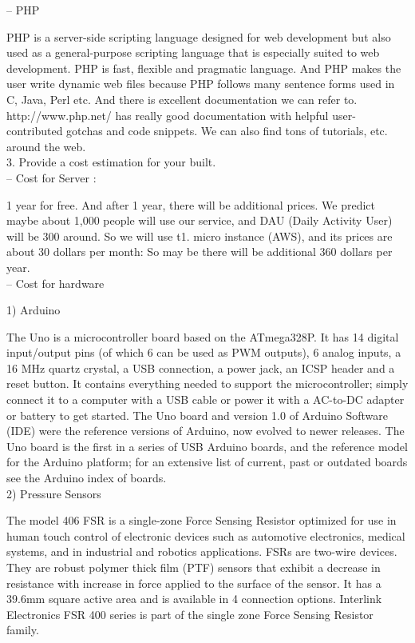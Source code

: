 \documentclass[conference]{IEEEtran}
\begin{document}
-- PHP

PHP is a server-side scripting language designed for web development but also used as a general-purpose scripting language that is especially suited to web development. PHP is fast, flexible and pragmatic language. And PHP makes the user write dynamic web files because PHP follows many sentence forms used in C, Java, Perl etc. And there is excellent documentation we can refer to. http://www.php.net/ has really good documentation with helpful user-contributed gotchas and code snippets. We can also find tons of tutorials, etc. around the web.\\

3.	Provide a cost estimation for your built.\\

-- Cost for Server :

1 year for free. And after 1 year, there will be additional prices. We predict maybe about 1,000 people will use our service, and DAU (Daily Activity User) will be 300 around. So we will use t1. micro instance (AWS), and its prices are about 30 dollars per month: So may be there will be additional 360 dollars per year.\\

-- Cost for hardware

1)	Arduino

The Uno is a microcontroller board based on the ATmega328P. It has 14 digital input/output pins (of which 6 can be used as PWM outputs), 6 analog inputs, a 16 MHz quartz crystal, a USB connection, a power jack, an ICSP header and a reset button. It contains everything needed to support the microcontroller; simply connect it to a computer with a USB cable or power it with a AC-to-DC adapter or battery to get started. The Uno board and version 1.0 of Arduino Software (IDE) were the reference versions of Arduino, now evolved to newer releases. The Uno board is the first in a series of USB Arduino boards, and the reference model for the Arduino platform; for an extensive list of current, past or outdated boards see the Arduino index of boards.\\

2)	Pressure Sensors

The model 406 FSR is a single-zone Force Sensing Resistor optimized for use in human touch control of electronic devices such as automotive electronics, medical systems, and in industrial and robotics applications. FSRs are two-wire devices. They are robust polymer thick film (PTF) sensors that exhibit a decrease in resistance with increase in force applied to the surface of the sensor. It has a 39.6mm square active area and is available in 4 connection options. Interlink Electronics FSR 400 series is part of the single zone Force Sensing Resistor family.\\
\end{document}
